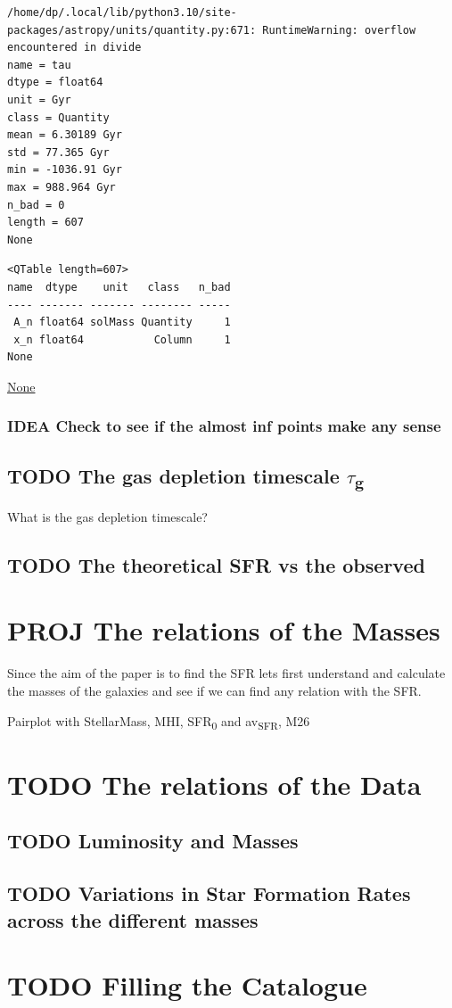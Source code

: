 \documentclass[a4paper]{article}
\begin{document}
\begin{verbatim}
/home/dp/.local/lib/python3.10/site-packages/astropy/units/quantity.py:671: RuntimeWarning: overflow encountered in divide
name = tau
dtype = float64
unit = Gyr
class = Quantity
mean = 6.30189 Gyr
std = 77.365 Gyr
min = -1036.91 Gyr
max = 988.964 Gyr
n_bad = 0
length = 607
None
\end{verbatim}

\begin{verbatim}
<QTable length=607>
name  dtype    unit   class   n_bad
---- ------- ------- -------- -----
 A_n float64 solMass Quantity     1
 x_n float64           Column     1
None
\end{verbatim}



\url{None}

\subsubsection{{\bfseries\sffamily IDEA} Check to see if the almost inf points make any sense}
\label{sec:orgbb07f9e}

\subsection{{\bfseries\sffamily TODO} The gas depletion timescale \(\tau\)\textsubscript{g}}
\label{sec:orgae7d362}
What is the gas depletion timescale?



\subsection{{\bfseries\sffamily TODO} The theoretical SFR vs the observed}
\label{sec:org0f23e0c}


\section{{\bfseries\sffamily PROJ} The relations of the Masses}
\label{sec:org39c52db}
Since the aim of the paper is to find the SFR lets first understand and calculate the masses of the galaxies and see if we can find any relation with the SFR.

Pairplot with StellarMass, MHI, SFR\textsubscript{0} and av\textsubscript{SFR}, M26



\section{{\bfseries\sffamily TODO} The relations of the Data}
\label{sec:org0f3fcd7}

\subsection{{\bfseries\sffamily TODO} Luminosity and Masses}
\label{sec:org752f14a}

\subsection{{\bfseries\sffamily TODO} Variations in Star Formation Rates across the different masses}
\label{sec:org862160e}


\section{{\bfseries\sffamily TODO} Filling the Catalogue}
\label{sec:orgd74b51d}
\end{document}
